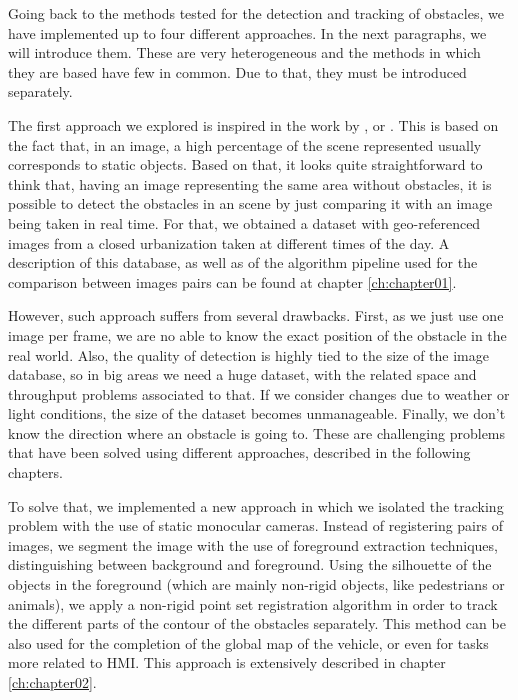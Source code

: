 Going back to the methods tested for the detection and tracking of obstacles, we have implemented up to four different approaches. In the next paragraphs, we will introduce them. These are very heterogeneous and the methods in which they are based have few in common. Due to that, they must be introduced separately.

The first approach we explored is inspired in the work by \cite{primdahl2005change},  \cite{diego2011video} or \cite{vallespi2012prior}. This is based on the fact that, in an image, a high percentage of the scene represented usually corresponds to static objects. Based on that, it looks quite straightforward to think that, having an image representing the same area without obstacles, it is possible to detect the obstacles in an scene by just comparing it with an image being taken in real time. For that, we obtained a dataset with geo-referenced images from a closed urbanization taken at different times of the day. A description of this database, as well as of the algorithm pipeline used for the comparison between images pairs can be found at chapter \ref{ch:chapter01}.

However, such approach suffers from several drawbacks. First, as we just use one image per frame, we are no able to know the exact position of the obstacle in the real world. Also, the quality of detection is highly tied to the size of the image database, so in big areas we need a huge dataset, with the related space and throughput problems associated to that. If we consider changes due to weather or light conditions, the size of the dataset becomes unmanageable. Finally, we don't know the direction where an obstacle is going to. These are challenging problems that have been solved using different approaches, described in the following chapters.

To solve that, we implemented a new approach in which we isolated the tracking problem with the use of static monocular cameras. Instead of registering pairs of images, we segment the image with the use of foreground extraction techniques, distinguishing between background and foreground. Using the silhouette of the objects in the foreground (which are mainly non-rigid objects, like pedestrians or animals), we apply a non-rigid point set registration algorithm in order to track the different parts of the contour of the obstacles separately. This method can be also used for the completion of the global map of the vehicle, or even for tasks more related to \ac{HMI}. This approach is extensively described in chapter \ref{ch:chapter02}.

